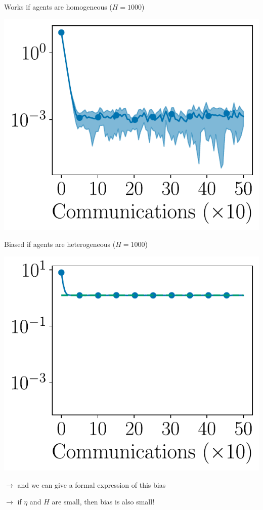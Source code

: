 \documentclass[17pt,aspectratio=169]{beamer}
\begin{document}
\begin{frame}
  \vspace{1em}

  Works if agents are homogeneous ($H=1000$)

  \begin{center}
    \includegraphics[width=0.4\linewidth]{plots/plot_hm_fedlsa.pdf}
  \end{center}

\end{frame}

\begin{frame}[t]
  \vspace{1em}

  Biased if agents are heterogeneous ($H=1000$)

  \begin{center}
    \includegraphics[width=0.4\linewidth]{plots/plot_hg_fedlsa.pdf}
  \end{center}

  $\rightarrow$ and we can give a formal expression of this bias

  $\rightarrow$ if $\eta$ and $H$ are small, then bias is also small!
\end{frame}
\end{document}
